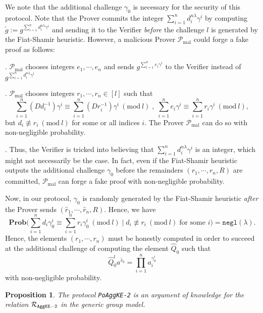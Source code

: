\documentclass[11pt, lettersize, notitlepage, leqno, footskip=0.6cm]{article}
\newcommand{\pl}{\prod\limits}
\newcommand{\slim}{\sum\limits}
\newcommand{\ttt}{\texttt}
\newcommand{\negl}{\ttt{{negl}}}
\newcommand{\wti}{\widetilde}
\newcommand{\mc}{\mathcal}
\newcommand{\mbf}{\mathbf}
\newcommand{\mr}{\mathrm}
\newcommand{\lam}{\lambda}
\newcommand{\what}{\widehat}
\newcommand{\Prob}{\mbf{Prob}}
\newcommand{\mP}{\mc{P}}
\newcommand{\vs}{\vspace{-0.15cm}}
\newcommand{\noin}{\noindent}
\newcommand{\Mod}[1]{\ (\mathrm{mod}\ #1)}
\newtheorem{Prop}[Thm]{Proposition}
\numberwithin{equation}{section}
\begin{document}
\vspace{0.2cm}

We note that the additional challenge $\gamma_0$ is necessary for the security of this protocol. Note that the Prover commits the integer $\slim_{i=1}^n d_i^{n\lam}\gamma^i$ by computing $\wti{g}:= g^{\slim_{i=1}^n d_i^{n\lam}\gamma^i}$ and sending it to the Verifier \textit{before} the challenge $l$ is generated by the Fiat-Shamir heuristic. However, a malicious Prover $\mP_{\mr{mal}}$ could forge a fake proof as follows:

\noin 1. $\mP_{\mr{mal}}$ chooses integers $e_1,\cdots,e_n$ and sends $g^{\slim_{i=1}^n e_i\gamma^i}$ to the Verifier instead of $g^{\slim_{i=1}^n d_i^{n\lam}\gamma^i}$

\noin 2. $\mP_{\mr{mal}}$ chooses integers $r_1,\cdots,r_n\in [l]$ such that \vs $$\slim_{i=1}^n (Dd_i^{-1})\gamma^i \equiv \slim_{i=1}^n (Dr_i^{-1})\gamma^i \Mod{l}\;,\; \slim_{i=1}^n e_i\gamma^i\equiv \slim_{i=1}^n r_i\gamma^i \Mod{l},$$ but $d_i\not\equiv r_i\Mod{l}$ for some or all indices $i$. The Prover $\mP_{\mr{mal}}$ can do so  with non-negligible probability.

\noin 3. Thus, the Verifier is tricked into believing that $\slim_{i=1}^n d_i^{n\lam}\gamma^i$ is an integer, which  might not necessarily be the case. In fact, even if the Fiat-Shamir heuristic outputs the additional challenge $\gamma_0$ before the remainders $(r_1,\cdots,r_n, R)$ are committed, $\mP_{\mr{mal}}$ can forge a fake proof with non-negligible probability. 

Now, in our protocol, $\gamma_0$ is randomly generated by the Fiat-Shamir heuristic \textit{after} the Prover sends $(\what{r}_1,\cdots,\what{r}_n, R)$. Hence, we have \vs $$\Prob\Big(\slim_{i=1}^n d_i\gamma_0^i \equiv \slim_{i=1}^n r_i\gamma_0^i \Mod{l}\;\Big|\; d_i\not\equiv r_i\Mod{l}\;\text{for some } i\Big) = \negl(\lam). $$ Hence, the elements $(r_1,\cdots,r_n)$ must be honestly computed in order to succeed at the additional challenge of computing the element $\what{Q}_0$ such that \vs $$\what{Q}_0^la^{\what{r}_0}= \pl_{i=1}^{n} a_i^{\gamma_0^i} $$ with non-negligible probability.

\noin 


\vspace{0.2cm}

\begin{Prop} The protocol \verb|PoAggKE-2| is an argument of knowledge for the relation $\mc{R}_{{\tt{AggKE-2}}}$ in the generic group model.\end{Prop}
\end{document}
